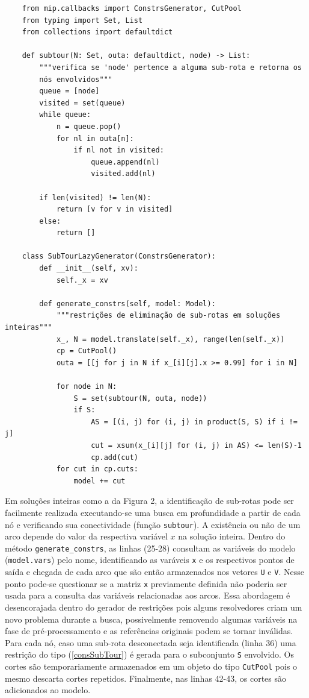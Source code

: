 \documentclass[a4paper,11pt,fleqn]{article}
\begin{document}
\begin{verbatim}
    from mip.callbacks import ConstrsGenerator, CutPool
    from typing import Set, List
    from collections import defaultdict

    def subtour(N: Set, outa: defaultdict, node) -> List:
        """verifica se 'node' pertence a alguma sub-rota e retorna os 
        nós envolvidos"""
        queue = [node]
        visited = set(queue)
        while queue:
            n = queue.pop()
            for nl in outa[n]:
                if nl not in visited:
                    queue.append(nl)
                    visited.add(nl)

        if len(visited) != len(N):
            return [v for v in visited]
        else:
            return []

    class SubTourLazyGenerator(ConstrsGenerator):
        def __init__(self, xv):
            self._x = xv

        def generate_constrs(self, model: Model):
            """restrições de eliminação de sub-rotas em soluções inteiras"""
            x_, N = model.translate(self._x), range(len(self._x))
            cp = CutPool()
            outa = [[j for j in N if x_[i][j].x >= 0.99] for i in N]

            for node in N:
                S = set(subtour(N, outa, node))
                if S:
                    AS = [(i, j) for (i, j) in product(S, S) if i != j]
                    cut = xsum(x_[i][j] for (i, j) in AS) <= len(S)-1
                    cp.add(cut)
            for cut in cp.cuts:
                model += cut
\end{verbatim}

Em soluções inteiras como a da Figura 2, a identificação de sub-rotas pode ser facilmente realizada executando-se uma busca em profundidade a partir de cada nó e verificando sua conectividade (função \texttt{subtour}). A existência ou não de um arco depende do valor da respectiva variável $x$ na solução inteira. Dentro do método \texttt{generate\_constrs}, as linhas (25-28) consultam as variáveis do modelo (\texttt{model.vars}) pelo nome, identificando as varáveis \texttt{x} e os respectivos pontos de saída e chegada de cada arco que são então armazenados nos vetores \texttt{U} e \texttt{V}. Nesse ponto pode-se questionar se a matriz \texttt{x} previamente definida não poderia ser usada para a consulta das variáveis relacionadas aos arcos. Essa abordagem é desencorajada dentro do gerador de restrições pois alguns resolvedores criam um novo problema durante a busca, possivelmente removendo algumas variáveis na fase de pré-processamento e as referências originais podem se tornar inválidas. Para cada nó, caso uma sub-rota desconectada seja identificada (linha 36) uma restrição do tipo (\ref{consSubTour}) é gerada para o subconjunto \texttt{S} envolvido. Os cortes são temporariamente armazenados em um objeto do tipo \texttt{CutPool} pois o mesmo descarta cortes repetidos. Finalmente, nas linhas 42-43, os cortes são adicionados ao modelo.
\end{document}
